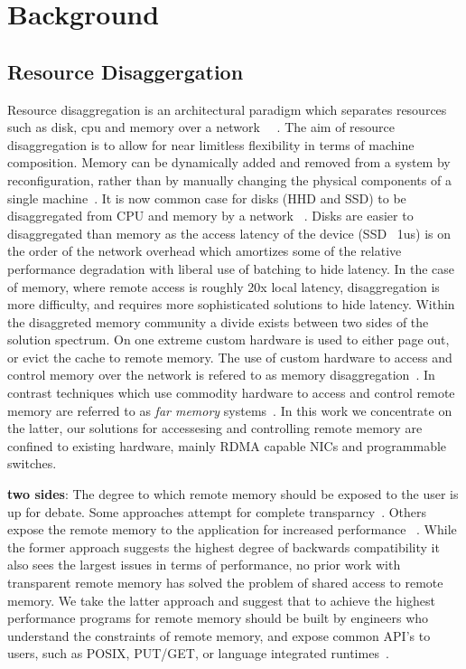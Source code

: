 \section{Background}


\subsection{Resource Disaggergation}

Resource disaggregation is an architectural paradigm which separates resources
such as disk, cpu and memory over a network ~\cite{requirements for resource
disaggregation}~\cite{legoOS}. The aim of resource disaggregation is to allow
for near limitless flexibility in terms of machine composition. Memory can be
dynamically added and removed from a system by reconfiguration, rather than by
manually changing the physical components of a single machine~\cite{fastswap}.
It is now common case for disks (HHD and SSD) to be disaggregated from CPU and
memory by a network ~\cite{decible}. Disks are easier to disaggregated than
memory as the access latency of the device (SSD ~1us) is on the order of the
network overhead which amortizes some of the relative performance degradation
with liberal use of batching to hide latency. In the case of memory, where
remote access is roughly 20x local latency, disaggregation is more difficulty,
and requires more sophisticated solutions to hide latency. Within the
disaggreted memory community a divide exists between two sides of the solution
spectrum. On one extreme custom hardware is used to either page out, or evict
the cache to remote memory. The use of custom hardware to access and control
memory over the network is refered to as memory disaggregation~\cite{clio,vmware
papers on cache line remote memory, there are a few others here}. In contrast
techniques which use commodity hardware to access and control remote memory are
referred to as \textit{far memory} systems~\cite{LegoOS, remote reigions,
Clover, ...(there are more)}. In this work we concentrate on the latter, our
solutions for accessesing and controlling remote memory are confined to existing
hardware, mainly RDMA capable NICs and programmable switches.

\textbf{two sides}: The degree to which remote memory should be exposed to the
user is up for debate. Some approaches attempt for complete
transparncy~\cite{Fastswap,GMS, all remote paging / cache systems}. Others
expose the remote memory to the application for increased performance
~\cite{remote regions, aifm}. While the former approach suggests the highest
degree of backwards compatibility it also sees the largest issues in terms of
performance, no prior work with transparent remote memory has solved the problem
of shared access to remote memory. We take the latter approach and suggest that
to achieve the highest performance programs for remote memory should be built by
engineers who understand the constraints of remote memory, and expose common
API's to users, such as POSIX, PUT/GET, or language integrated
runtimes~\cite{there are many cites here}.

